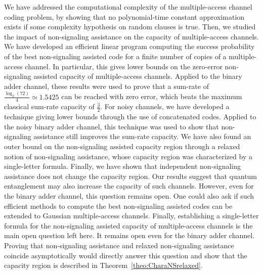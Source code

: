 We have addressed the computational complexity of the multiple-access channel coding problem, by showing that no polynomial-time constant approximation exists if some complexity hypothesis on random clauses is true. Then, we studied the impact of non-signaling assistance on the capacity of multiple-access channels. We have developed an efficient linear program computing the success probability of the best non-signaling assisted code for a finite number of copies of a multiple-access channel. In particular, this gives lower bounds on the zero-error non-signaling assisted capacity of multiple-access channels. Applied to the binary adder channel, these results were used to prove that a sum-rate of $\frac{\log_2(72)}{4} \simeq 1.5425$ can be reached with zero error, which beats the maximum classical sum-rate capacity of $\frac{3}{2}$. For noisy channels, we have developed a technique giving lower bounds through the use of concatenated codes. Applied to the noisy binary adder channel, this technique was used to show that non-signaling assistance still improves the sum-rate capacity. We have also found an outer bound on the non-signaling assisted capacity region through a relaxed notion of non-signaling assistance, whose capacity region was characterized by a single-letter formula. Finally, we have shown that independent non-signaling assistance does not change the capacity region. Our results suggest that quantum entanglement may also increase the capacity of such channels. However, even for the binary adder channel, this question remains open. One could also ask if such efficient methods to compute the best non-signaling assisted codes can be extended to Gaussian multiple-access channels. Finally, establishing a single-letter formula for the non-signaling assisted capacity of multiple-access channels is the main open question left here. It remains open even for the binary adder channel. Proving that non-signaling assistance and relaxed non-signaling assistance coincide asymptotically would directly answer this question and show that the capacity region is described in Theorem~\ref{theo:CharaNSrelaxed}.

